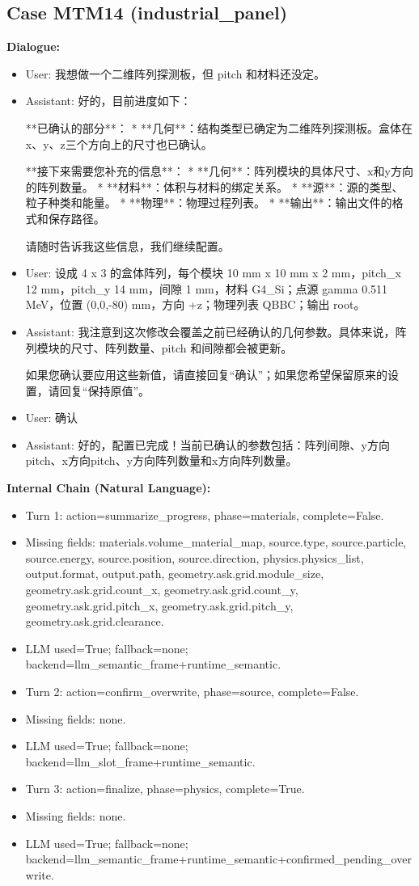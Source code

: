 \documentclass[11pt]{ctexart}
\begin{document}
\subsection{Case MTM14 (industrial\_panel)}
\textbf{Dialogue:}
\begin{itemize}
\item User: 我想做一个二维阵列探测板，但 pitch 和材料还没定。
\item Assistant: 好的，目前进度如下：

**已确认的部分**：
*   **几何**：结构类型已确定为二维阵列探测板。盒体在x、y、z三个方向上的尺寸也已确认。

**接下来需要您补充的信息**：
*   **几何**：阵列模块的具体尺寸、x和y方向的阵列数量。
*   **材料**：体积与材料的绑定关系。
*   **源**：源的类型、粒子种类和能量。
*   **物理**：物理过程列表。
*   **输出**：输出文件的格式和保存路径。

请随时告诉我这些信息，我们继续配置。
\item User: 设成 4 x 3 的盒体阵列，每个模块 10 mm x 10 mm x 2 mm，pitch\_x 12 mm，pitch\_y 14 mm，间隙 1 mm，材料 G4\_Si；点源 gamma 0.511 MeV，位置 (0,0,-80) mm，方向 +z；物理列表 QBBC；输出 root。
\item Assistant: 我注意到这次修改会覆盖之前已经确认的几何参数。具体来说，阵列模块的尺寸、阵列数量、pitch 和间隙都会被更新。

如果您确认要应用这些新值，请直接回复“确认”；如果您希望保留原来的设置，请回复“保持原值”。
\item User: 确认
\item Assistant: 好的，配置已完成！当前已确认的参数包括：阵列间隙、y方向pitch、x方向pitch、y方向阵列数量和x方向阵列数量。
\end{itemize}
\textbf{Internal Chain (Natural Language):}
\begin{itemize}
\item Turn 1: action=summarize\_progress, phase=materials, complete=False.
\item Missing fields: materials.volume\_material\_map, source.type, source.particle, source.energy, source.position, source.direction, physics.physics\_list, output.format, output.path, geometry.ask.grid.module\_size, geometry.ask.grid.count\_x, geometry.ask.grid.count\_y, geometry.ask.grid.pitch\_x, geometry.ask.grid.pitch\_y, geometry.ask.grid.clearance.
\item LLM used=True; fallback=none; backend=llm\_semantic\_frame+runtime\_semantic.
\item Turn 2: action=confirm\_overwrite, phase=source, complete=False.
\item Missing fields: none.
\item LLM used=True; fallback=none; backend=llm\_slot\_frame+runtime\_semantic.
\item Turn 3: action=finalize, phase=physics, complete=True.
\item Missing fields: none.
\item LLM used=True; fallback=none; backend=llm\_semantic\_frame+runtime\_semantic+confirmed\_pending\_overwrite.
\end{itemize}
\end{document}
